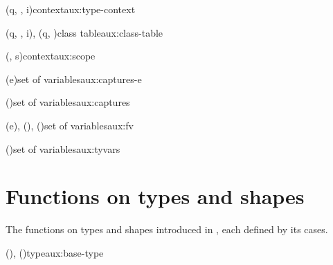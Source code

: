 \begin{auxfunction}{\typeContext{\Gamma}(q, \seq{\chi}, i)}{context}{aux:type-context}

\end{auxfunction}

\begin{auxfunction}{\classTable{\Gamma}(q, \seq{\chi}, i), \classTable{\Gamma}(q, \seq{\chi})}{class table}{aux:class-table}

\vspace{-\baselineskip}
\end{auxfunction}

\begin{auxfunction}{\scopeS(, s)}{context}{aux:scope}

\end{auxfunction}

\begin{auxfunction}{\captures(e)}{set of variables}{aux:captures-e}

\end{auxfunction}

\begin{auxfunction}{\captures()}{set of variables}{aux:captures}

\end{auxfunction}

\begin{auxfunction}{\fv(e), \fv(), \fv(\tau)}{set of variables}{aux:fv}

\end{auxfunction}

\begin{auxfunction}{\tyvars(\Gamma)}{set of variables}{aux:tyvars}

\end{auxfunction}

\section{Functions on types and shapes}
\label{sec:types-auxiliary}

The functions on types and shapes introduced in , each defined by its cases.

\begin{auxfunction}{\baseType(\ell), \baseType(\tau)}{type}{aux:base-type}

\end{auxfunction}

